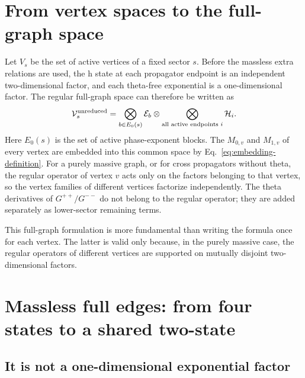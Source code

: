 \documentclass[11pt,a4paper]{article}
\newcommand{\cV}{\mathcal V}
\newcommand{\cE}{\mathcal E}
\newcommand{\cH}{\mathcal H}
\begin{document}
\section{From vertex spaces to the full-graph space}

Let $V_s$ be the set of active vertices of a fixed sector $s$. Before the massless extra relations are used, the h state at each propagator endpoint is an independent two-dimensional factor, and each theta-free exponential is a one-dimensional factor. The regular full-graph space can therefore be written as
\begin{equation}
 \cV_s^{\rm unreduced}
 =\bigotimes_{b\in E_0(s)}\cE_b
 \otimes
 \bigotimes_{\text{all active endpoints }i}\cH_i.
 \label{eq:global-unreduced-space}
\end{equation}
Here $E_0(s)$ is the set of active phase-exponent blocks. The $M_{0,v}$ and $M_{1,v}$ of every vertex are embedded into this common space by Eq.~\eqref{eq:embedding-definition}. For a purely massive graph, or for cross propagators without theta, the regular operator of vertex $v$ acts only on the factors belonging to that vertex, so the vertex families of different vertices factorize independently. The theta derivatives of $G^{++}/G^{--}$ do not belong to the regular operator; they are added separately as lower-sector remaining terms.

This full-graph formulation is more fundamental than writing the formula once for each vertex. The latter is valid only because, in the purely massive case, the regular operators of different vertices are supported on mutually disjoint two-dimensional factors.

\section{Massless full edges: from four states to a shared two-state}

\subsection{It is not a one-dimensional exponential factor}
\end{document}
